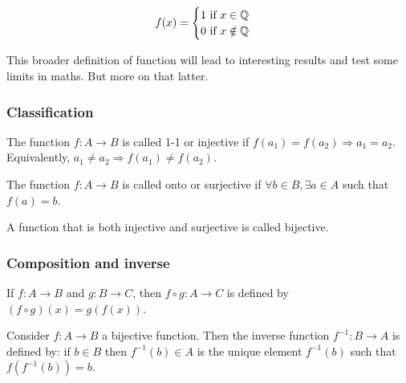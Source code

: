 \begin{eg}
    \begin{equation*}
        f(x) = \begin{cases}
            1 \text{ if } x \in \mathbb{Q} \\
            0 \text{ if } x \notin \mathbb{Q}
        \end{cases}
    \end{equation*}
\end{eg}

\vspace{1em}
This broader definition of function will lead to interesting results and test some limits in maths. But more on that latter.

\subsubsection{Classification}

\begin{definition}
    The function $f: A \to B$ is called 1-1 or injective if $f(a_1) = f(a_2) \Rightarrow a_1 = a_2$. Equivalently, $a_1 \neq a_2 \Rightarrow f(a_1) \neq f(a_2)$.
\end{definition}

\begin{definition}
    The function $f: A \to B$ is called onto or surjective if $\forall b \in B, \exists a \in A$ such that $ f(a) = b$.
\end{definition}

\begin{definition}
    A function that is both injective and surjective is called bijective.
\end{definition}

\subsubsection{Composition and inverse}

\begin{definition}
    If $f: A \to B$ and $g: B \to C$, then $f \circ g: A \to C$ is defined by $(f \circ g)(x) = g(f(x))$.
\end{definition}

\begin{definition}
    Consider $f: A \to B$ a bijective function. Then the inverse function $f^{-1}: B \to A$ is defined by: if $b \in B$ then $f^{-1}(b) \in A$ is the unique element $f^{-1}(b)$ such that $f(f^{-1}(b)) = b$.
\end{definition}

